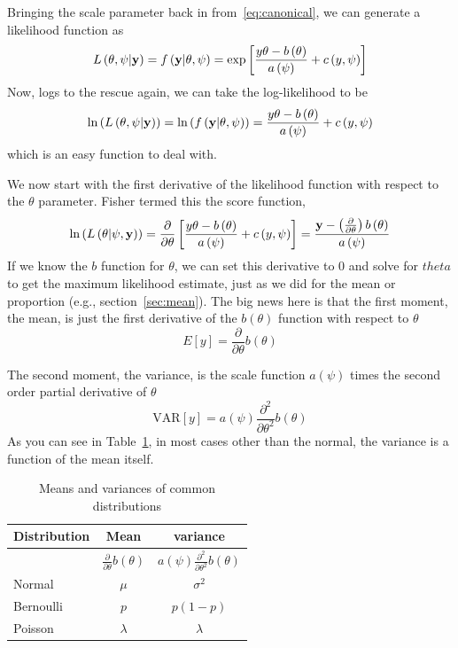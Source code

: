 Bringing the scale parameter back in from~\ref{eq:canonical}, we can generate a likelihood function as
\[
L\left(\theta,\psi|{\bf y}\right)=f\left({\bf y}|\theta,\psi\right)=\mbox{exp}\left[\frac{y\theta-b\left(\theta\right)}{a\left(\psi\right)}+c\left(y,\psi\right)\right]
\]
Now, logs to the rescue again, we can take the log-likelihood to be
\begin{equation}
\mbox{ln}\left(L\left(\theta,\psi|{\bf y}\right)\right)=\mbox{ln}\left(f\left({\bf y}|\theta,\psi\right)\right)=\frac{y\theta-b\left(\theta\right)}{a\left(\psi\right)}+c\left(y,\psi\right)
\end{equation}
which is an easy function to deal with.

We now start with the first derivative of the likelihood function with respect to the $\theta$ parameter. Fisher termed this the score function,
\begin{equation}
\mbox{ln}\left(L\left(\theta|\psi,{\bf y}\right)\right)=\frac{\partial}{\partial\theta}\left[\frac{y\theta-b\left(\theta\right)}{a\left(\psi\right)}+c\left(y,\psi\right)
\right]=\frac{{\bf y}-\left(\frac{\partial}{\partial\theta}\right)b\left(\theta\right)}{a\left(\psi\right)}
\end{equation}
If we know the $b$ function for $\theta$, we can set this derivative to 0 and solve for $theta$ to get the maximum likelihood estimate, just as we did for the mean or proportion (e.g., section~\ref{sec:mean}). The big news here is that the first moment, the mean, is just the first derivative of the $b\left(\theta\right)$ function with respect to $\theta$
\begin{equation}
E[y] = \frac{\partial}{\partial \theta}b(\theta)
\end{equation}

The second moment, the variance, is the scale function $a\left(\psi\right)$ times the
second order partial derivative of $\theta$
\begin{equation}
\mbox{VAR}[y] = a\left(\psi\right)\frac{\partial^2}{\partial \theta^2}b(\theta)
\end{equation}
As you can see in Table~\ref{tab:glmmeansandvar}, in most cases other than the normal, the variance is a function of the mean itself.

\begin{table}[htbp]\centering
\caption{Means and variances of common distributions\label{tab:glmmeansandvar}
\textbf{} }\begin{tabular} {@{} l cc @{}} \\
Distribution & Mean & variance \\ \hline
& $\frac{\partial}{\partial \theta}b(\theta)$ & $a\left(\psi\right)\frac{\partial^2}{\partial \theta^2}b(\theta)$ \\ \hline
Normal & $\mu$ & $\sigma^2$ \\
Bernoulli & $p$ & $p(1-p)$ \\
Poisson & $\lambda$ & $\lambda$ \\ \hline
\end{tabular}
\end{table}

